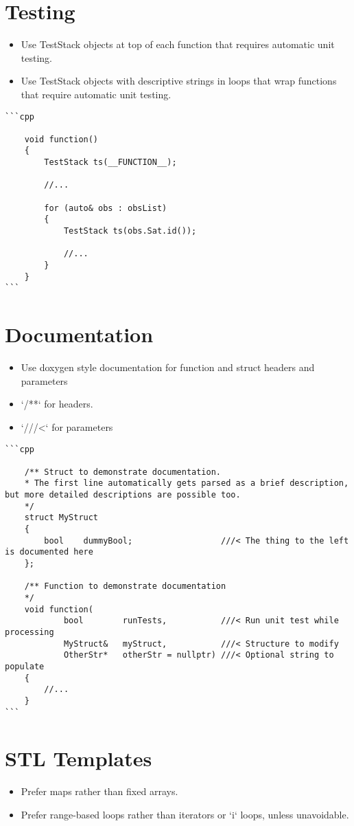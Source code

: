 \section{Testing}
\begin{itemize}
	\item Use TestStack objects at top of each function that requires automatic unit testing.
	\item Use TestStack objects with descriptive strings in loops that wrap functions that require automatic unit testing.
\end{itemize}
\begin{verbatim}
```cpp

    void function()
    {
        TestStack ts(__FUNCTION__);

        //...

        for (auto& obs : obsList)
        {
            TestStack ts(obs.Sat.id());

            //...
        }
    }
```
\end{verbatim}
\section{Documentation}
\begin{itemize}
\item Use doxygen style documentation for function and struct headers and parameters
\item `/**`  for headers.
\item `///<` for parameters
\end{itemize}
\begin{verbatim}
```cpp

    /** Struct to demonstrate documentation.
    * The first line automatically gets parsed as a brief description, but more detailed descriptions are possible too.
    */
    struct MyStruct
    {
        bool    dummyBool;                  ///< The thing to the left is documented here
    };

    /** Function to demonstrate documentation
    */
    void function(
            bool        runTests,           ///< Run unit test while processing
            MyStruct&   myStruct,           ///< Structure to modify
            OtherStr*	otherStr = nullptr)	///< Optional string to populate
    {
    	//...
    }
```
\end{verbatim}

\section{STL Templates}
\begin{itemize}
\item Prefer maps rather than fixed arrays.
\item Prefer range-based loops rather than iterators or `i` loops, unless unavoidable.
\end{itemize}

